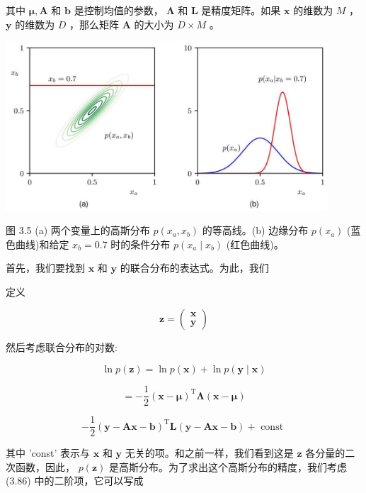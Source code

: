 \documentclass[10pt]{report}
\begin{document}
其中 \(\mathbf{\mu },\mathbf{A}\) 和 \(\mathbf{b}\) 是控制均值的参数， \(\mathbf{\Lambda }\) 和 \(\mathbf{L}\) 是精度矩阵。如果 \(\mathbf{x}\) 的维数为 \(M\) ， \(\mathbf{y}\) 的维数为 \(D\) ，那么矩阵 \(\mathbf{A}\) 的大小为 \(D \times  M\) 。

\begin{center}
\includegraphics[max width=0.9\textwidth]{images/0194e279-9b28-703a-88f4-c3ac21e2010d_101_325_345_1158_609_0.jpg}
\end{center}
\hspace*{3em} 

图 3.5 (a) 两个变量上的高斯分布 \(p\left( {{x}_{a},{x}_{b}}\right)\) 的等高线。(b) 边缘分布 \(p\left( {x}_{a}\right)\) (蓝色曲线)和给定 \({x}_{b} = {0.7}\) 时的条件分布 \(p\left( {{x}_{a} \mid  {x}_{b}}\right)\) (红色曲线)。

首先，我们要找到 \(\mathbf{x}\) 和 \(\mathbf{y}\) 的联合分布的表达式。为此，我们

定义

\[
\mathbf{z} = \left( \begin{array}{l} \mathbf{x} \\  \mathbf{y} \end{array}\right)  \tag{3.85}
\]

然后考虑联合分布的对数:

\[
\ln p\left( \mathbf{z}\right)  = \ln p\left( \mathbf{x}\right)  + \ln p\left( {\mathbf{y} \mid  \mathbf{x}}\right)
\]

\[
=  - \frac{1}{2}{\left( \mathbf{x} - \mathbf{\mu }\right) }^{\mathrm{T}}\mathbf{\Lambda }\left( {\mathbf{x} - \mathbf{\mu }}\right)
\]

\[
- \frac{1}{2}{\left( \mathbf{y} - \mathbf{A}\mathbf{x} - \mathbf{b}\right) }^{\mathrm{T}}\mathbf{L}\left( {\mathbf{y} - \mathbf{A}\mathbf{x} - \mathbf{b}}\right)  + \text{ const } \tag{3.86}
\]

其中 ’const’ 表示与 \(\mathbf{x}\) 和 \(\mathbf{y}\) 无关的项。和之前一样，我们看到这是 \(\mathbf{z}\) 各分量的二次函数，因此， \(p\left( \mathbf{z}\right)\) 是高斯分布。为了求出这个高斯分布的精度，我们考虑 (3.86) 中的二阶项，它可以写成
\end{document}

